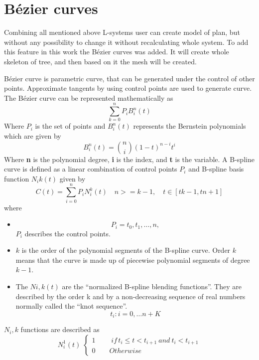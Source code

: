 \documentclass[b5paper,twoside,11pt]{article}
\begin{document}
\section{Bézier curves}
Combining all mentioned above L-systems user can create model of plan, but without any possibility to change it without recalculating whole system. To add this feature in this work the Bézier curves was added. It will create whole skeleton of tree, and then based on it the mesh will be created.

Bézier curve is parametric curve, that can be generated under the control of other points. Approximate tangents by using control points are used to generate curve. The Bézier curve can be represented mathematically as
\begin{equation}
\sum\limits_{k=0}^n P_i B_{i}^{n}(t)
\end{equation}
Where $P_i$ is the set of points and $B_{i}^{n}(t)$ represents the Bernstein polynomials which are given by 
\begin{equation}
B_{i}^{n}(t)=\binom{n}{i}(1-t)^{n-i}t^{i}
\end{equation}
Where \textbf{n} is the polynomial degree, \textbf{i} is the index, and \textbf{t} is the variable.
\newline
A B-spline curve is defined as a linear combination of control points $P_i$ and B-spline basis function $N_i	 k (t)$ given by
  \begin{equation}
  C(t)=\sum\limits_{i=0}^n P_i N_{i}^{k}(t)\quad n>=k-1, \quad t \in [tk-1,tn+1]
  \end{equation}
where
\begin{itemize}
\item \begin{equation}\label{conPoi}
P_i={t_0,t_1,\ldots,n},
\end{equation}
$P_i$ describes the control points.
\item $k$ is the order of the polynomial segments of the B-spline curve. Order ${k}$ means that the curve is made up of piecewise polynomial segments of degree $k - 1$.
\item The $Ni,k(t)$ are the “normalized B-spline blending functions”. They are described by the order k and by a non-decreasing sequence of real numbers normally called the “knot sequence”.
\begin{equation}
t_i:i={0,\ldots n+K}
\end{equation}
\end{itemize}
$N_i, k$ functions are described as 
\begin{equation} N_{i}^{1}(t)\;
\begin{cases} 1\qquad \;if \, t_i\leq t< t_{i+1}\:and\: t_i<t_{i+1} \\ 
0 \qquad   Otherwise
 \end{cases}
  \end{equation}
  
\end{document}
